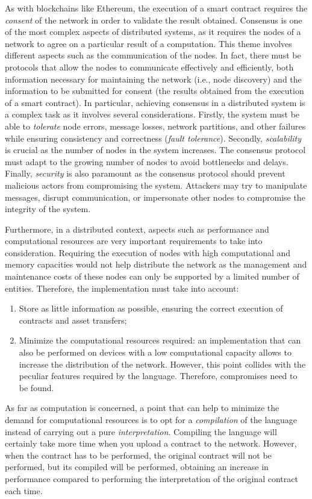 As with blockchains like Ethereum, the execution of a smart contract requires the \textit{consent} of the 
network in order to validate the result obtained. Consensus is one of the most complex aspects of 
distributed systems, as it requires the nodes of a network to agree on a particular result of a 
computation. This theme involves different aspects such as the communication of the nodes. In fact, there 
must be protocols that allow the nodes to communicate effectively and efficiently, both information 
necessary for maintaining the network (i.e., node discovery) and the information to be submitted for 
consent (the results obtained from the execution of a smart contract). In particular, achieving consensus 
in a distributed system is a complex task as it involves several considerations. Firstly, the system must 
be able to \textit{tolerate} node errors, message losses, network partitions, and other failures while 
ensuring consistency and correctness (\textit{fault tolerance}). Secondly, \textit{scalability} is crucial 
as the number of nodes in the system increases. The consensus protocol must adapt to the growing number of 
nodes to avoid bottlenecks and delays. Finally, \textit{security} is also paramount as the consensus 
protocol should prevent malicious actors from compromising the system. Attackers may try to manipulate 
messages, disrupt communication, or impersonate other nodes to compromise the integrity of the system.

Furthermore, in a distributed context, aspects such as performance and computational resources are very 
important requirements to take into consideration. Requiring the execution of nodes with high computational 
and memory capacities would not help distribute the network as the management and maintenance costs of 
these nodes can only be supported by a limited number of entities. Therefore, the implementation must take 
into account:
\begin{enumerate}
	\item Store as little information as possible, ensuring the correct execution of contracts and asset 
	transfers;
	\item Minimize the computational resources required: an implementation that can also be performed on 
	devices with a low computational capacity allows to increase the distribution of the network. However, 
	this point collides with the peculiar features required by the language. Therefore, compromises need to 
	be found.
\end{enumerate}
As far as computation is concerned, a point that can help to minimize the demand for computational 
resources is to opt for a \textit{compilation} of the language instead of carrying out a pure 
\textit{interpretation}. Compiling the language will certainly take more time when you upload a contract to 
the network. However, when the contract has to be performed, the original contract will not be performed, 
but its compiled will be performed, obtaining an increase in performance compared to performing the 
interpretation of the original contract each time.

